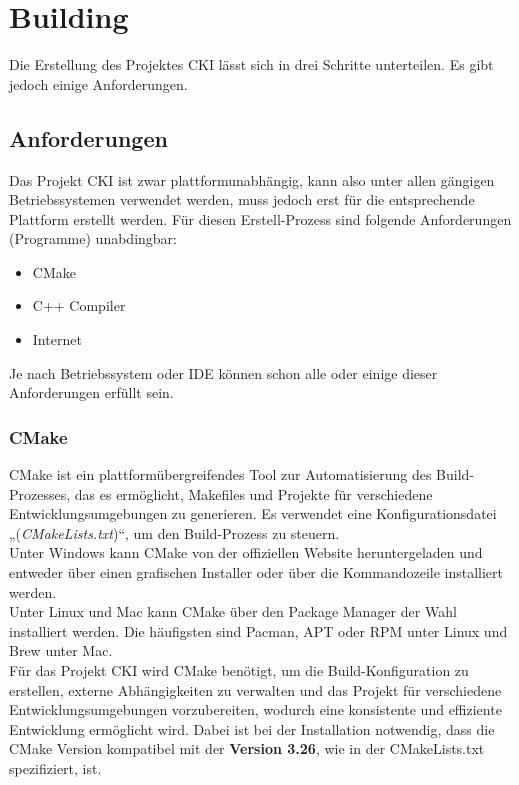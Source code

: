 \section{Building}
\label{sec:DeployBuilding}
Die Erstellung des Projektes CKI lässt sich in drei Schritte unterteilen. Es gibt jedoch einige Anforderungen.
\subsection{Anforderungen}
\label{sec:BuildAnforderungen}
Das Projekt CKI ist zwar plattformunabhängig, kann also unter allen gängigen Betriebssystemen verwendet werden, muss jedoch erst für die entsprechende Plattform erstellt werden. Für diesen Erstell-Prozess sind folgende Anforderungen (Programme) unabdingbar:
\begin{itemize}
	\item CMake
	\item C++ Compiler
	\item Internet
\end{itemize}
Je nach Betriebssystem oder IDE können schon alle oder einige dieser Anforderungen erfüllt sein.

\subsubsection{CMake}
\label{sec:BuildCMake}
CMake ist ein plattformübergreifendes Tool zur Automatisierung des Build-Prozesses, das es ermöglicht, Makefiles und Projekte für verschiedene Entwicklungsumgebungen zu generieren. Es verwendet eine Konfigurationsdatei „(\textit{CMakeLists.txt})“, um den Build-Prozess zu steuern. 
\\
Unter Windows kann CMake von der offiziellen Website heruntergeladen und entweder über einen grafischen Installer oder über die Kommandozeile installiert werden.
\\
Unter Linux und Mac kann CMake über den Package Manager der Wahl installiert werden. Die häufigsten sind Pacman, APT oder RPM unter Linux und Brew unter Mac.
\\
Für das Projekt CKI wird CMake benötigt, um die Build-Konfiguration zu erstellen, externe Abhängigkeiten zu verwalten und das Projekt für verschiedene Entwicklungsumgebungen vorzubereiten, wodurch eine konsistente und effiziente Entwicklung ermöglicht wird. Dabei ist bei der Installation notwendig, dass die CMake Version kompatibel mit der \textbf{Version 3.26}, wie in der CMakeLists.txt spezifiziert, ist.

